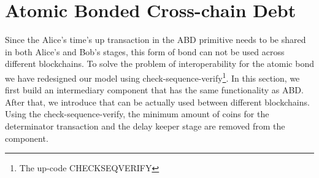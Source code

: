 \section{Atomic Bonded Cross-chain Debt}
\label{sec:abcd}

Since the Alice's time's up transaction in the ABD primitive needs to be shared in both Alice's and Bob's stages, this form of bond can not be used across different blockchains. To solve the problem of interoperability for the atomic bond\new{,} we have redesigned our model using check-sequence-verify\footnote{The up-code CHECKSEQVERIFY}. In this section, we first build an intermediary component that has the same functionality as ABD. After that, we introduce  that can be actually used between different blockchains.
Using the check-sequence-verify, the minimum amount of coins for the determinator transaction and the delay keeper stage are removed from the component.
